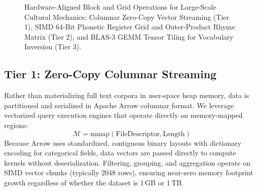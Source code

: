 \documentclass[11pt,a4paper]{article}
\begin{document}
\begin{figure}[t]
\caption{Hardware-Aligned Block and Grid Operations for Large-Scale Cultural Mechanics: Columnar Zero-Copy Vector Streaming (Tier 1), SIMD 64-Bit Phonetic Register Grid and Outer-Product Rhyme Matrix (Tier 2), and BLAS-3 GEMM Tensor Tiling for Vocabulary Inversion (Tier 3).}
\label{fig:arch}
\end{figure}

\subsection{Tier 1: Zero-Copy Columnar Streaming}
Rather than materializing full text corpora in user-space heap memory, data is partitioned and serialized in Apache Arrow columnar format. We leverage vectorized query execution engines that operate directly on memory-mapped regions:
\begin{equation}
    \mathcal{M} = \text{mmap}(\text{FileDescriptor}, \text{Length})
\end{equation}
Because Arrow uses standardized, contiguous binary layouts with dictionary encoding for categorical fields, data vectors are passed directly to compute kernels without deserialization. Filtering, grouping, and aggregation operate on SIMD vector chunks (typically 2048 rows), ensuring near-zero memory footprint growth regardless of whether the dataset is 1\,GB or 1\,TB.
\end{document}
